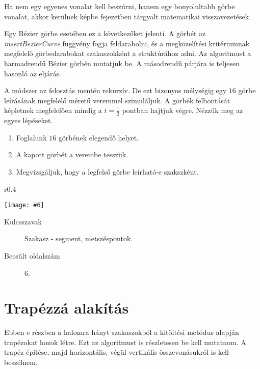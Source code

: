\documentclass[12pt]{report}
\makeatletter
\theoremstyle{definition}
\newcommand{\func}[1]{{\textsl{#1}}}
\newcommand{\melyikoldalra}{r}
\newlength{\Xoffset}
\newlength{\Yoffset}
\newcommand*{\setpdfoffset}[2]{%
  \setlength{\Xoffset}{#1}%
  \setlength{\Yoffset}{#2}%
}
\newcommand*{\setviewport}[4]{%
  \def\x@viewport{%
    {\the\dimexpr#1-\Xoffset}
    {\the\dimexpr#2-\Yoffset}
    {\the\dimexpr#3-\Xoffset}
    {\the\dimexpr#4-\Yoffset}%
  }%
}
\newcommand{\includegraphicskivagas}[6]{
    \setpdfoffset{0pt}{0pt}
    \setviewport{#1}{#2}{#3}{#4}
    \texttt{[image: \#6]}
}
\newcommand{\includedataflowkivagas}[5]{
    \includegraphicskivagas{#1}{#2}{#3}{#4}{scale=0.6,#5}
    {img/built/dataflow_eps}
}
\makeatother
\begin{document}
Ha nem egy egyenes vonalat kell beszúrni, hanem egy bonyolultabb görbe vonalat,
akkor kerülnek képbe  fejezetben tárgyalt matematikai
visszavezetések.

Egy Bézier görbe esetében ez a következőket jelenti. A görbét az
\func{insertBezierCurve} függvény fogja feldarabolni, és a megközelítési kritériumnak
megfelelő görbedarabokat szakaszokként a struktúrához adni.
Az algoritmust a harmadrendű Bézier görbén mutatjuk be. A másodrendű
párjára is teljesen hasonló az eljárás.

A módszer az felosztás mentén rekurzív. De ezt bizonyos mélységig egy $16$
görbe leírásának megfelelő méretű veremmel szimuláljuk. A görbék felbontását
 képletnek megfelelően mindig a $t=\frac{1}{2}$ pontban hajtjuk
végre. Nézzük meg az egyes lépéseket.
  \begin{enumerate}
    \item Foglalunk $16$ görbének elegendő helyet.
    \item A kapott görbét a verembe tesszük.
    \item Megvizsgáljuk, hogy a legfelső görbe leírható-e szakszként.
  \end{enumerate}

  \begin{wrapfigure}{\melyikoldalra}{0.4\textwidth}
    \begin{center}
      \includedataflowkivagas{345pt}{400pt}{525pt}{590pt}{}
    \end{center}
    \caption{\label{dataflow-segment} A belső Path API részei}
  \end{wrapfigure}

  \begin{description}
    \item[Kulcsszavak] Szakasz - segment, metszéspontok.
    \item[Becsült oldalszám] 6.
  \end{description}

  \section{Trapézzá alakítás}

Ebben e részben a halomra hányt szakaszokból a kitöltési metódus
alapján trapézokat hozok létre. Ezt az algoritmust is részletesen be kell
mutatnom. A trapéz építése, majd horizontális, végül vertikális
összevonásukról is kell beszélnem.
\end{document}

